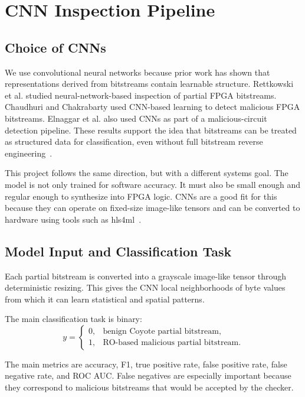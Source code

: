 \chapter{CNN Inspection Pipeline}
\label{ch:cnn-pipeline}

\section{Choice of CNNs}
\label{sec:cnn-choice}

We use convolutional neural networks because prior work has shown that representations derived from bitstreams contain learnable structure. Rettkowski et al. studied neural-network-based inspection of partial FPGA bitstreams. Chaudhuri and Chakrabarty used CNN-based learning to detect malicious FPGA bitstreams. Elnaggar et al. also used CNNs as part of a malicious-circuit detection pipeline. These results support the idea that bitstreams can be treated as structured data for classification, even without full bitstream reverse engineering~\cite{rettkowski2019inspection,chaudhuri2022detection,chaudhuri2023criticality,chaudhuri2023detectionclassification,elnaggar2023learning,palumbo2022trojan}.

This project follows the same direction, but with a different systems goal. The model is not only trained for software accuracy. It must also be small enough and regular enough to synthesize into FPGA logic. CNNs are a good fit for this because they can operate on fixed-size image-like tensors and can be converted to hardware using tools such as hls4ml~\cite{duarte2018fast,aarrestad2021fast}.

\section{Model Input and Classification Task}
\label{sec:model-input-task}

Each partial bitstream is converted into a grayscale image-like tensor through deterministic resizing. This gives the CNN local neighborhoods of byte values from which it can learn statistical and spatial patterns.

The main classification task is binary:
\[
    y =
    \begin{cases}
        0, & \text{benign Coyote partial bitstream},\\
        1, & \text{RO-based malicious partial bitstream}.
    \end{cases}
\]

The main metrics are accuracy, F1, true positive rate, false positive rate, false negative rate, and ROC AUC. False negatives are especially important because they correspond to malicious bitstreams that would be accepted by the checker.

